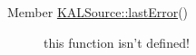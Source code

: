 \label{todo__todo000001}
\hypertarget{todo__todo000001}{}
 \begin{description}
\item[Member \hyperlink{class_k_a_l_source_e49f05979d560258949935990bb6540d}{KALSource::lastError}() ]this function isn't defined! \end{description}
